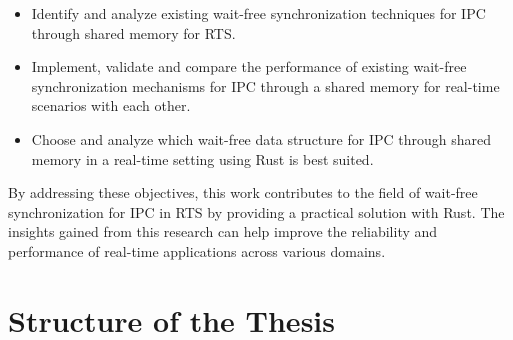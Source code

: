 \begin{itemize}
\item Identify and analyze existing wait-free synchronization techniques for \ac{IPC} through shared memory for \ac{RTS}.
\item Implement, validate and compare the performance of existing wait-free synchronization mechanisms for \ac{IPC} through a shared memory for real-time scenarios with each other.
\item Choose and analyze which wait-free data structure for \ac{IPC} through shared memory in a real-time setting using Rust is best suited.
\end{itemize}

By addressing these objectives, this work contributes to the field of wait-free synchronization for \ac{IPC} in \ac{RTS} by providing a practical solution with Rust. The insights gained from this research can help improve the reliability and performance of real-time applications across various domains.

\section{Structure of the Thesis}\label{sec:structure-of-the-thesis}